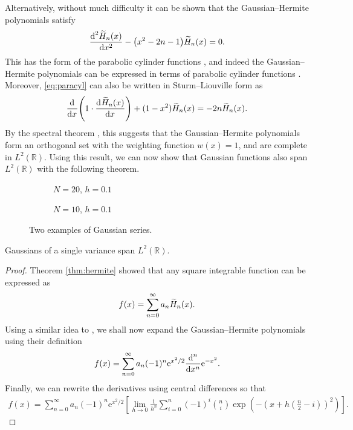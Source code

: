 Alternatively, without much difficulty it can be shown that the Gaussian--Hermite polynomials satisfy
\begin{align}
\label{eq:paracyl}
\diff[2]{\Her{n}{x}}{x} - \left( x^2 - 2n - 1 \right) \Her{n}{x} = 0.
\end{align}
This has the form of the parabolic cylinder functions \cite{miller}, and indeed the Gaussian--Hermite polynomials can be expressed in terms of parabolic cylinder functions \cite{hochstrasser, miller}. Moreover, \eqref{eq:paracyl} can also be written in Sturm--Liouville form as
\begin{align*}
\diff{}{x} \left( 1 \cdot \diff{\Her{n}{x}}{x} \right) + (1 - x^2) \Her{n}{x} = -2n \Her{n}{x}.
\end{align*}
By the spectral theorem \cite{griffel, higson, kreyszig}, this suggests that the Gaussian--Hermite polynomials form an orthogonal set with the weighting function $w(x) = 1$, and are complete in $L^2(\mathbb{R})$. Using this result, we can now show that Gaussian functions also span $L^2(\mathbb{R})$ with the following theorem. \\

\begin{figure}[tbp]
\begin{subfigure}{0.5\textwidth}

\caption{$N = 20$, $h = 0.1$}
\end{subfigure}
\begin{subfigure}{0.5\textwidth}

\caption{$N = 10$, $h = 0.1$}
\end{subfigure}
\caption{Two examples of Gaussian series.}
\label{fig:gs}
\end{figure}

\begin{theorem}
\label{thm:gaussian}
Gaussians of a single variance span $L^2(\mathbb{R})$.
\end{theorem}
\begin{proof}
Theorem \ref{thm:hermite} showed that any square integrable function can be expressed as
\begin{align*}
f(x) = \sum_{n = 0}^\infty a_n \Her{n}{x}.
\end{align*}
Using a similar idea to \cite{calcaterra2, calcaterra}, we shall now expand the Gaussian--Hermite polynomials using their definition
\begin{align*}
f(x) = \sum_{n = 0}^\infty a_n (-1)^n \textrm{e}^{x^2/2} \diff[n]{}{x} \textrm{e}^{-x^2}.
\end{align*}
Finally, we can rewrite the derivatives using central differences \cite{zwillinger} so that
\begin{align}
f(x) = \sum_{n = 0}^\infty a_n (-1)^n \textrm{e}^{x^2/2} \left[ \lim_{h \rightarrow 0} \frac{1}{h^n} \sum_{i = 0}^n (-1)^i \binom{n}{i} \exp\left( -\left( x + h\left( \frac{n}{2} - i \right) \right)^2 \right) \right].
\label{eq:gs}
\end{align}
\end{proof}

